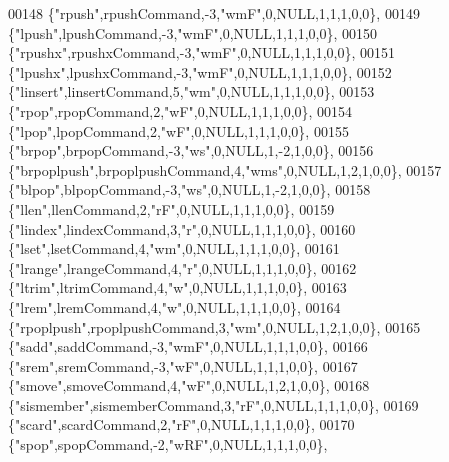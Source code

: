 \begin{DoxyCode}
00148     \{\textcolor{stringliteral}{"rpush"},rpushCommand,-3,\textcolor{stringliteral}{"wmF"},0,NULL,1,1,1,0,0\},
00149     \{\textcolor{stringliteral}{"lpush"},lpushCommand,-3,\textcolor{stringliteral}{"wmF"},0,NULL,1,1,1,0,0\},
00150     \{\textcolor{stringliteral}{"rpushx"},rpushxCommand,-3,\textcolor{stringliteral}{"wmF"},0,NULL,1,1,1,0,0\},
00151     \{\textcolor{stringliteral}{"lpushx"},lpushxCommand,-3,\textcolor{stringliteral}{"wmF"},0,NULL,1,1,1,0,0\},
00152     \{\textcolor{stringliteral}{"linsert"},linsertCommand,5,\textcolor{stringliteral}{"wm"},0,NULL,1,1,1,0,0\},
00153     \{\textcolor{stringliteral}{"rpop"},rpopCommand,2,\textcolor{stringliteral}{"wF"},0,NULL,1,1,1,0,0\},
00154     \{\textcolor{stringliteral}{"lpop"},lpopCommand,2,\textcolor{stringliteral}{"wF"},0,NULL,1,1,1,0,0\},
00155     \{\textcolor{stringliteral}{"brpop"},brpopCommand,-3,\textcolor{stringliteral}{"ws"},0,NULL,1,-2,1,0,0\},
00156     \{\textcolor{stringliteral}{"brpoplpush"},brpoplpushCommand,4,\textcolor{stringliteral}{"wms"},0,NULL,1,2,1,0,0\},
00157     \{\textcolor{stringliteral}{"blpop"},blpopCommand,-3,\textcolor{stringliteral}{"ws"},0,NULL,1,-2,1,0,0\},
00158     \{\textcolor{stringliteral}{"llen"},llenCommand,2,\textcolor{stringliteral}{"rF"},0,NULL,1,1,1,0,0\},
00159     \{\textcolor{stringliteral}{"lindex"},lindexCommand,3,\textcolor{stringliteral}{"r"},0,NULL,1,1,1,0,0\},
00160     \{\textcolor{stringliteral}{"lset"},lsetCommand,4,\textcolor{stringliteral}{"wm"},0,NULL,1,1,1,0,0\},
00161     \{\textcolor{stringliteral}{"lrange"},lrangeCommand,4,\textcolor{stringliteral}{"r"},0,NULL,1,1,1,0,0\},
00162     \{\textcolor{stringliteral}{"ltrim"},ltrimCommand,4,\textcolor{stringliteral}{"w"},0,NULL,1,1,1,0,0\},
00163     \{\textcolor{stringliteral}{"lrem"},lremCommand,4,\textcolor{stringliteral}{"w"},0,NULL,1,1,1,0,0\},
00164     \{\textcolor{stringliteral}{"rpoplpush"},rpoplpushCommand,3,\textcolor{stringliteral}{"wm"},0,NULL,1,2,1,0,0\},
00165     \{\textcolor{stringliteral}{"sadd"},saddCommand,-3,\textcolor{stringliteral}{"wmF"},0,NULL,1,1,1,0,0\},
00166     \{\textcolor{stringliteral}{"srem"},sremCommand,-3,\textcolor{stringliteral}{"wF"},0,NULL,1,1,1,0,0\},
00167     \{\textcolor{stringliteral}{"smove"},smoveCommand,4,\textcolor{stringliteral}{"wF"},0,NULL,1,2,1,0,0\},
00168     \{\textcolor{stringliteral}{"sismember"},sismemberCommand,3,\textcolor{stringliteral}{"rF"},0,NULL,1,1,1,0,0\},
00169     \{\textcolor{stringliteral}{"scard"},scardCommand,2,\textcolor{stringliteral}{"rF"},0,NULL,1,1,1,0,0\},
00170     \{\textcolor{stringliteral}{"spop"},spopCommand,-2,\textcolor{stringliteral}{"wRF"},0,NULL,1,1,1,0,0\},

\end{DoxyCode}
